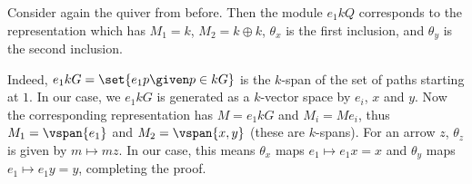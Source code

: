 Consider again the quiver from before. Then the module $e_1 kQ$ corresponds
to the representation which has $M_1 = k$, $M_2 = k\oplus k$, $\theta_x$ is
the first inclusion, and $\theta_y$ is the second inclusion.

Indeed, $e_1kG = \set{e_1p\given p \in kG}$ is the $k$-span of the set of paths starting
at $1$. In our case, we $e_1kG$ is generated as a $k$-vector space by
$e_i$, $x$ and $y$. Now the corresponding representation has $M = e_1kG$ and
$M_i = Me_i$, thus $M_1 = \vspan{e_1}$ and $M_2 = \vspan{x, y}$ (these are
$k$-spans). For an arrow $z$, $\theta_z$ is given by $m\mapsto mz$. In our
case, this means $\theta_x$ maps $e_1 \mapsto e_1x = x$ and $\theta_y$ maps
$e_1\mapsto e_1y = y$, completing the proof.
